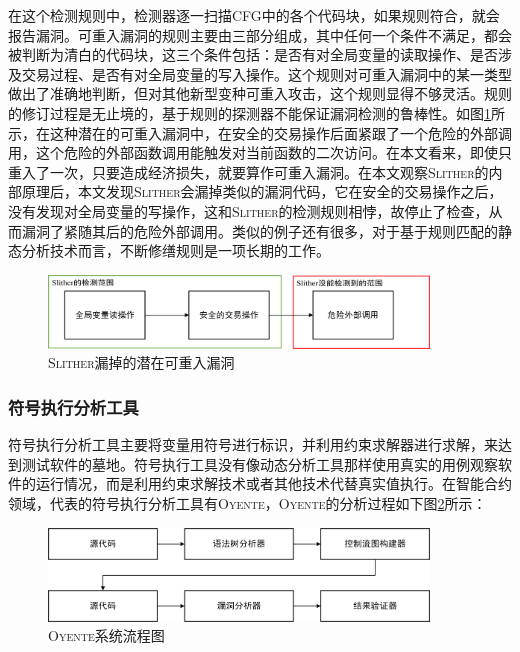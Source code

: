 在这个检测规则中，检测器逐一扫描CFG中的各个代码块，如果规则符合，就会报告漏洞。可重入漏洞的规则主要由三部分组成，其中任何一个条件不满足，都会被判断为清白的代码块，这三个条件包括：是否有对全局变量的读取操作、是否涉及交易过程、是否有对全局变量的写入操作。这个规则对可重入漏洞中的某一类型做出了准确地判断，但对其他新型变种可重入攻击，这个规则显得不够灵活。规则的修订过程是无止境的，基于规则的探测器不能保证漏洞检测的鲁棒性。如图\ref{fig:reentrancy_variant}所示，在这种潜在的可重入漏洞中，在安全的交易操作后面紧跟了一个危险的外部调用，这个危险的外部函数调用能触发对当前函数的二次访问。在本文看来，即使只重入了一次，只要造成经济损失，就要算作可重入漏洞。在本文观察\textsc{Slither}的内部原理后，本文发现\textsc{Slither}会漏掉类似的漏洞代码，它在安全的交易操作之后，没有发现对全局变量的写操作，这和\textsc{Slither}的检测规则相悖，故停止了检查，从而漏洞了紧随其后的危险外部调用。类似的例子还有很多，对于基于规则匹配的静态分析技术而言，不断修缮规则是一项长期的工作。

\begin{figure}
\vspace{+2mm}
  \centering
  \includegraphics[width=0.9\textwidth]{figures/variant_reentrancy_pattern.png}
  \caption{\textsc{Slither}漏掉的潜在可重入漏洞}
  \label{fig:reentrancy_variant}
\vspace{-5mm}
\end{figure}



\subsubsection{符号执行分析工具}

符号执行分析工具主要将变量用符号进行标识，并利用约束求解器进行求解，来达到测试软件的墓地。符号执行工具没有像动态分析工具那样使用真实的用例观察软件的运行情况，而是利用约束求解技术或者其他技术代替真实值执行。在智能合约领域，代表的符号执行分析工具有\textsc{Oyente}，\textsc{Oyente}的分析过程如下图\ref{fig:oyente_process}所示：

\begin{figure}
\vspace{+2mm}
  \centering
  \includegraphics[width=0.9\textwidth]{figures/oyente_process.png}
  \caption{\textsc{Oyente}系统流程图}
  \label{fig:oyente_process}
\vspace{-5mm}
\end{figure}

